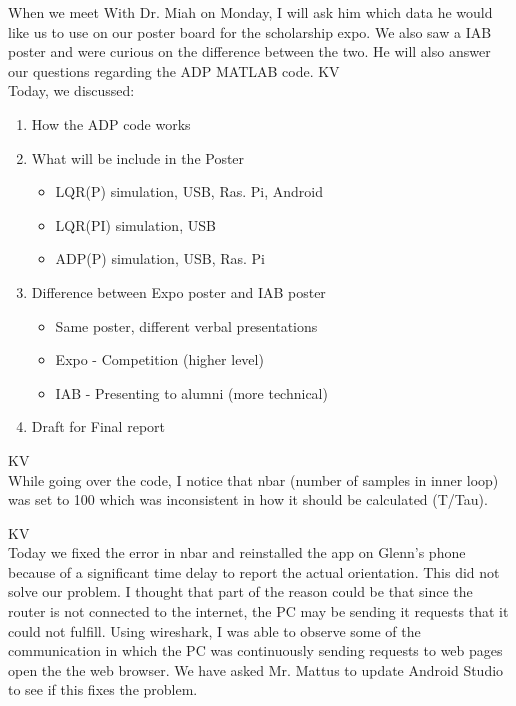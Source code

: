\documentclass[fontsize=11pt, %
                             paper=letter, %
                             openany, %
                             captions=tableheading,
                             index=totoc,
                             hyperref]{labbook}
\begin{document}
\begin{addmargin}[0cm]{0cm}
When we meet With Dr. Miah on Monday, I will ask him which data he would like us to use on our poster board for the scholarship expo.  We also saw a IAB poster and were curious on the difference between the two.  He will also answer our questions regarding the ADP MATLAB code.
KV\\
Today, we discussed:
\begin{enumerate}
    \item How the ADP code works
    \item What will be include in the Poster
    \begin{itemize}
        \item LQR(P) simulation, USB, Ras. Pi, Android
        \item LQR(PI) simulation, USB
        \item ADP(P) simulation, USB, Ras. Pi
    \end{itemize}
    \item Difference between Expo poster and IAB poster
    \begin{itemize}
        \item Same poster, different verbal presentations
        \item Expo - Competition (higher level)
        \item IAB - Presenting to alumni (more technical)
    \end{itemize}
    \item Draft for Final report
\end{enumerate}

KV\\
While going over the code, I notice that nbar (number of samples in inner loop) was set to 100 which was inconsistent in how it should be calculated (T/Tau).

KV\\
Today we fixed the error in nbar and reinstalled the app on Glenn's phone because of a significant time delay to report the actual orientation.  This did not solve our problem.  I thought that part of the reason could be that since the router is not connected to the internet, the PC may be sending it requests that it could not fulfill.  Using wireshark, I was able to observe some of the communication in which the PC was continuously sending requests to web pages open the the web browser.  We have asked Mr. Mattus to update Android Studio to see if this fixes the problem.


\end{addmargin}
\end{document}
